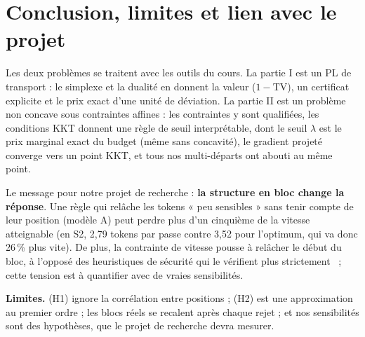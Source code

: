 \documentclass[11pt,a4paper]{article}
\newcommand{\TV}{\mathrm{TV}}
\theoremstyle{plain}
\theoremstyle{definition}
\begin{document}
\section{Conclusion, limites et lien avec le projet}
Les deux problèmes se traitent avec les outils du cours. La partie I est un PL de transport : le simplexe et la dualité en donnent la valeur ($1-\TV$), un certificat explicite et le prix exact d'une unité de déviation. La partie II est un problème non concave sous contraintes affines : les contraintes y sont qualifiées, les conditions KKT donnent une règle de seuil interprétable, dont le seuil $\lambda$ est le prix marginal exact du budget (même sans concavité), le gradient projeté converge vers un point KKT, et tous nos multi-départs ont abouti au même point.

Le message pour notre projet de recherche : \textbf{la structure en bloc change la réponse}. Une règle qui relâche les tokens « peu sensibles » sans tenir compte de leur position (modèle A) peut perdre plus d'un cinquième de la vitesse atteignable (en S2, 2,79 tokens par passe contre 3,52 pour l'optimum, qui va donc 26\,\% plus vite). De plus, la contrainte de vitesse pousse à relâcher le début du bloc, à l'opposé des heuristiques de sécurité qui le vérifient plus strictement~\cite{secure} ; cette tension est à quantifier avec de vraies sensibilités.

\textbf{Limites.} (H1) ignore la corrélation entre positions ; (H2) est une approximation au premier ordre ; les blocs réels se recalent après chaque rejet ; et nos sensibilités sont des hypothèses, que le projet de recherche devra mesurer.

\appendix
\end{document}
